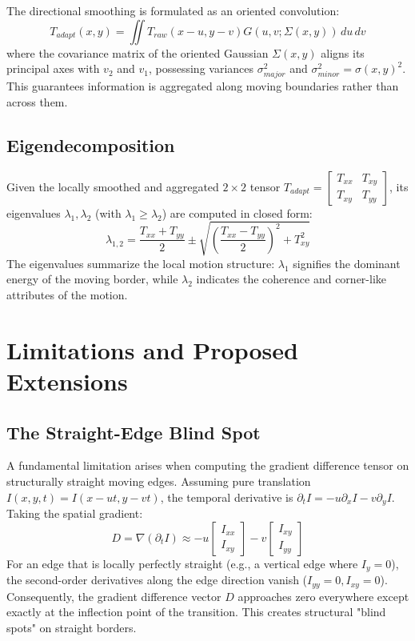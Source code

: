\documentclass[preprint,12pt]{elsarticle}
\begin{document}
The directional smoothing is formulated as an oriented convolution:
\begin{equation} \label{eq:directional}
    T_{adapt}(x,y) = \iint T_{raw}(x-u, y-v) G(u, v ; \Sigma(x,y)) \, du \, dv
\end{equation}
where the covariance matrix of the oriented Gaussian $\Sigma(x,y)$ aligns its principal axes with $v_2$ and $v_1$, possessing variances $\sigma_{major}^2$ and $\sigma_{minor}^2 = \sigma(x,y)^2$. This guarantees information is aggregated along moving boundaries rather than across them.

\subsection{Eigendecomposition}
Given the locally smoothed and aggregated $2 \times 2$ tensor $T_{adapt} = \begin{bmatrix} T_{xx} & T_{xy} \\ T_{xy} & T_{yy} \end{bmatrix}$, its eigenvalues $\lambda_1, \lambda_2$ (with $\lambda_1 \ge \lambda_2$) are computed in closed form:
\begin{equation} \label{eq:eigen}
    \lambda_{1,2} = \frac{T_{xx} + T_{yy}}{2} \pm \sqrt{\left(\frac{T_{xx} - T_{yy}}{2}\right)^2 + T_{xy}^2}
\end{equation}
The eigenvalues summarize the local motion structure: $\lambda_1$ signifies the dominant energy of the moving border, while $\lambda_2$ indicates the coherence and corner-like attributes of the motion.

\section{Limitations and Proposed Extensions}
\label{sec:limitations}

\subsection{The Straight-Edge Blind Spot}
A fundamental limitation arises when computing the gradient difference tensor on structurally straight moving edges. Assuming pure translation $I(x,y,t) = I(x - ut, y - vt)$, the temporal derivative is $\partial_t I = -u \partial_x I - v \partial_y I$. Taking the spatial gradient:
\begin{equation}
    D = \nabla(\partial_t I) \approx -u \begin{bmatrix} I_{xx} \\ I_{xy} \end{bmatrix} - v \begin{bmatrix} I_{xy} \\ I_{yy} \end{bmatrix}
\end{equation}
For an edge that is locally perfectly straight (e.g., a vertical edge where $I_y=0$), the second-order derivatives along the edge direction vanish ($I_{yy}=0, I_{xy}=0$). Consequently, the gradient difference vector $D$ approaches zero everywhere except exactly at the inflection point of the transition. This creates structural "blind spots" on straight borders.
\end{document}
